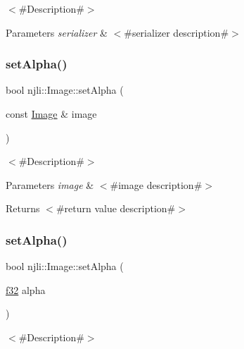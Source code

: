 $<$\#\+Description\#$>$


\begin{DoxyParams}{Parameters}
{\em serializer} & $<$\#serializer description\#$>$ \\
\hline
\end{DoxyParams}
\mbox{\label{classnjli_1_1_image_ac0af5dfc7833f19b47aeff225506271b}} 
\subsubsection{\texorpdfstring{set\+Alpha()}{setAlpha()}\hspace{0.1cm}{\footnotesize\ttfamily [1/2]}}
{\footnotesize\ttfamily bool njli\+::\+Image\+::set\+Alpha (\begin{DoxyParamCaption}\item[{const \mbox{\hyperlink{classnjli_1_1_image}{Image}} \&}]{image }\end{DoxyParamCaption})}

$<$\#\+Description\#$>$


\begin{DoxyParams}{Parameters}
{\em image} & $<$\#image description\#$>$\\
\hline
\end{DoxyParams}
\begin{DoxyReturn}{Returns}
$<$\#return value description\#$>$ 
\end{DoxyReturn}
\mbox{\label{classnjli_1_1_image_abbf9c8b23419953dba0bc0ac4133aad9}} 
\subsubsection{\texorpdfstring{set\+Alpha()}{setAlpha()}\hspace{0.1cm}{\footnotesize\ttfamily [2/2]}}
{\footnotesize\ttfamily bool njli\+::\+Image\+::set\+Alpha (\begin{DoxyParamCaption}\item[{\mbox{\hyperlink{_util_8h_a5f6906312a689f27d70e9d086649d3fd}{f32}}}]{alpha }\end{DoxyParamCaption})}

$<$\#\+Description\#$>$


